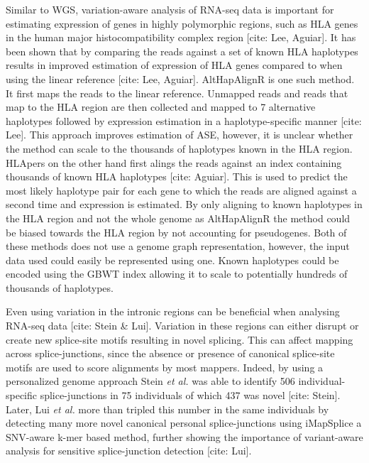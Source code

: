 Similar to WGS, variation-aware analysis of RNA-seq data is important for estimating expression of genes in highly polymorphic regions, such as HLA genes in the human major histocompatibility complex region [cite: Lee, Aguiar]. 
It has been shown that by comparing the reads against a set of known HLA haplotypes results in improved estimation of expression of HLA genes compared to when using the linear reference [cite: Lee, Aguiar].
AltHapAlignR is one such method. It first maps the reads to the linear reference. Unmapped reads and reads that map to the HLA region are then collected and mapped to 7 alternative haplotypes followed by expression estimation in a haplotype-specific manner [cite: Lee]. 
This approach improves estimation of ASE, however, it is unclear whether the method can scale to the thousands of haplotypes known in the HLA region.
HLApers on the other hand first alings the reads against an index containing thousands of known HLA haplotypes [cite: Aguiar]. 
This is used to predict the most likely haplotype pair for each gene to which the reads are aligned against a second time and expression is estimated. 
By only aligning to known haplotypes in the HLA region and not the whole genome as AltHapAlignR the method could be biased towards the HLA region by not accounting for pseudogenes.
Both of these methods does not use a genome graph representation, however, the input data used could easily be represented using one.
Known haplotypes could be encoded using the GBWT index allowing it to scale to potentially hundreds of thousands of haplotypes. 

Even using variation in the intronic regions can be beneficial when analysing RNA-seq data [cite: Stein & Lui]. 
Variation in these regions can either disrupt or create new splice-site motifs resulting in novel splicing. 
This can affect mapping across splice-junctions, since the absence or presence of canonical splice-site motifs are used to score alignments by most mappers. 
Indeed, by using a personalized genome approach Stein \textit{et al.} was able to identify 506 individual-specific splice-junctions in 75 individuals of which 437 was novel [cite: Stein]. 
Later, Lui \textit{et al.} more than tripled this number in the same individuals by detecting many more novel canonical personal splice-junctions using iMapSplice a SNV-aware k-mer based method, further showing the importance of variant-aware analysis for sensitive splice-junction detection [cite: Lui]. 


